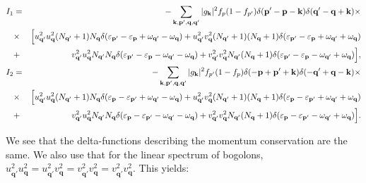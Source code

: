 %
\begin{footnotesize}
\begin{eqnarray}
I_1&=&-\sum_{\mathbf{k},\mathbf{p}',\mathbf{q},\mathbf{q}'}|g_\textbf{k}|^2f_p(1-f_{p'})\delta(\textbf{p}'-\textbf{p}-\textbf{k})\delta(\textbf{q}'-\textbf{q}+\textbf{k})\times\\\nonumber
&\times&\Bigl[u^2_{\textbf{q}'}u^2_{\textbf{q}}(N_{\textbf{q}'}+1)N_{\textbf{q}}
\delta(\varepsilon_{\textbf{p}'}-\varepsilon_{\textbf{p}}+\omega_{\textbf{q}'}-\omega_{\textbf{q}})
+u^2_{\textbf{q}'}v^2_{\textbf{q}}(N_{\textbf{q}'}+1)(N_{\textbf{q}}+1)
\delta(\varepsilon_{\textbf{p}'}-\varepsilon_{\textbf{p}}+\omega_{\textbf{q}'}+\omega_{\textbf{q}})\\\nonumber
&+&v^2_{\textbf{q}'}u^2_{\textbf{q}}N_{\textbf{q}'}N_{\textbf{q}}
\delta(\varepsilon_{\textbf{p}'}-\varepsilon_{\textbf{p}}-\omega_{\textbf{q}'}-\omega_{\textbf{q}})
+v^2_{\textbf{q}'}v^2_{\textbf{q}}N_{\textbf{q}'}(N_{\textbf{q}}+1)
\delta(\varepsilon_{\textbf{p}'}-\varepsilon_{\textbf{p}}-\omega_{\textbf{q}'}+\omega_{\textbf{q}})\Bigr],\\
\nonumber
I_2&=&-\sum_{\mathbf{k},\mathbf{p}',\mathbf{q},\mathbf{q}'}|g_\textbf{k}|^2f_{p'}(1-f_{p})\delta(-\textbf{p}+\textbf{p}'+\textbf{k})\delta(-\textbf{q}'+\textbf{q}-\textbf{k})\times\\\nonumber
&\times&\Bigl[u^2_{\textbf{q}'}u^2_{\textbf{q}}(N_{\textbf{q}'}+1)N_{\textbf{q}}
\delta(\varepsilon_{\textbf{p}}-\varepsilon_{\textbf{p}'}+\omega_{\textbf{q}'}-\omega_{\textbf{q}})
+u^2_{\textbf{q}'}v^2_{\textbf{q}}(N_{\textbf{q}'}+1)(N_{\textbf{q}}+1)
\delta(\varepsilon_{\textbf{p}}-\varepsilon_{\textbf{p}'}+\omega_{\textbf{q}'}+\omega_{\textbf{q}})\\\nonumber
&+&v^2_{\textbf{q}'}u^2_{\textbf{q}}N_{\textbf{q}'}N_{\textbf{q}}
\delta(\varepsilon_{\textbf{p}}-\varepsilon_{\textbf{p}'}-\omega_{\textbf{q}'}-\omega_{\textbf{q}})
+v^2_{\textbf{q}'}v^2_{\textbf{q}}N_{\textbf{q}'}(N_{\textbf{q}}+1)
\delta(\varepsilon_{\textbf{p}}-\varepsilon_{\textbf{p}'}-\omega_{\textbf{q}'}+\omega_{\textbf{q}})\Bigr].
\end{eqnarray}
\end{footnotesize}
%
We see that the delta-functions describing the momentum conservation are the same. We also use that for the linear spectrum of bogolons,  $u^2_{\textbf{q}'}u^2_{\textbf{q}}=u^2_{\textbf{q}'}v^2_{\textbf{q}}=v^2_{\textbf{q}'}v^2_{\textbf{q}}=v^2_{\textbf{q}'}v^2_{\textbf{q}}$.
This yields:
%
